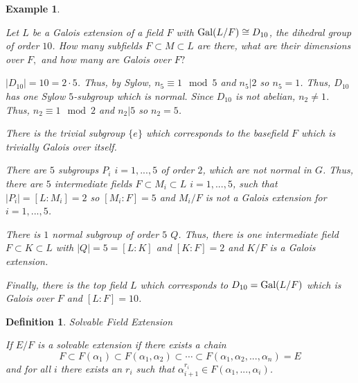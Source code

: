 \documentclass[12pt]{Qual}
\newtheorem{example}{Example}
\newtheorem{definition}{Definition}
\begin{document}
\begin{example}
$\,$

\begin{framed}
Let $L$ be a Galois extension of a field $F$ with $\text{Gal}(L/F)\cong D_{10}$, the dihedral group of order $10$. How many subfields $F\subset M\subset L$ are there, what are their dimensions over $F,$ and how many are Galois over $F?$
\end{framed}

$|D_{10}|=10=2\cdot 5$. Thus, by Sylow, $n_5\equiv 1\mod 5$ and $n_5|2$ so $n_5=1$. Thus, $D_{10}$ has one Sylow $5$-subgroup which is normal. Since $D_{10}$ is not abelian, $n_2\not=1$. Thus, $n_2\equiv 1\mod 2$ and $n_2|5$ so $n_2=5$.

There is the trivial subgroup $\{e\}$ which corresponds to the basefield $F$ which is trivially Galois over itself.

There are $5$ subgroups $P_i$ $i=1,...,5$ of order $2$, which are not normal in $G$. Thus, there are $5$ intermediate fields $F\subset M_i\subset L$ $i=1,...,5$, such that $|P_i|=[L:M_i]=2$ so $[M_i:F]=5$ and $M_i/F$ is not a Galois extension for $i=1,...,5$.

There is $1$ normal subgroup of order $5$ $Q$. Thus, there is one intermediate field $F\subset K\subset L$ with $|Q|=5=[L:K]$ and $[K:F]=2$ and $K/F$ is a Galois extension.

Finally, there is the top field $L$ which corresponds to $D_{10}=\text{Gal}(L/F)$ which is Galois over $F$ and $[L:F]=10$.
\end{example}
\vspace{0.5cm}
\begin{definition}{\Large\textit{Solvable Field Extension}}
$\,$

If $E/F$ is a solvable extension if there exists a chain $$F\subset F(\alpha_1)\subset F(\alpha_1,\alpha_2)\subset\cdots\subset F(\alpha_1,\alpha_2,...,\alpha_n)=E$$ and for all $i$ there exists an $r_i$ such that $\alpha_{i+1}^{r_i}\in F(\alpha_1,...,\alpha_i)$.

\end{definition}
\vspace{0.5cm}
\end{document}
